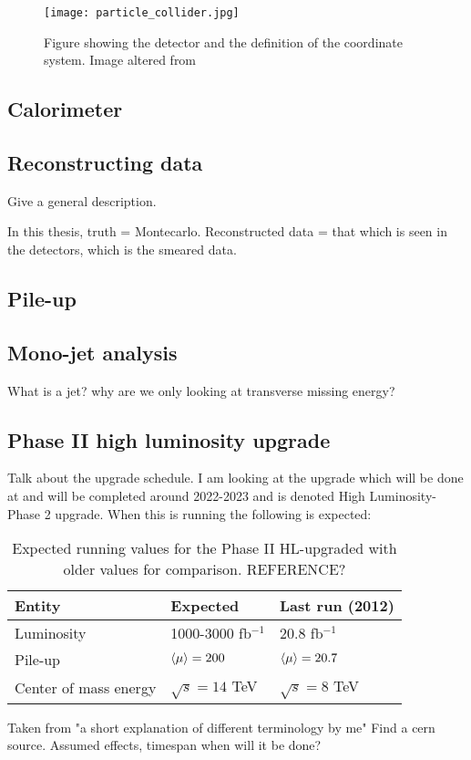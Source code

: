 \begin{figure}[ht]
\begin{center}
\texttt{[image: particle\_collider.jpg]}
\caption{Figure showing the \abbrATLAS detector and the definition of the coordinate system. Image altered from\citep{coordimage}}
\label{fig:coordinatesystem}
\end{center}
\end{figure}

\subsection{Calorimeter}
\subsection{Reconstructing data}
Give a general description.

In this thesis, truth = Montecarlo. 
Reconstructed data = that which is seen in the detectors, which is the smeared data.
\subsection{Pile-up}\label{sec:experiment:subsec:pileup}
\subsection{Mono-jet analysis}\label{sec:experiment:subsec:monojet}
What is a jet? why are we only looking at transverse missing energy? 

\subsection{Phase II high luminosity upgrade}
Talk about the upgrade schedule. \citep{ATLAS:LOI2}
I am looking at the upgrade which will be done at \abbrCERN and will be completed around 2022-2023 and is denoted High Luminosity-\abbrLHC Phase 2 upgrade. When this is running the following is expected:
\renewcommand{\arraystretch}{1.5} %
\begin{table}[H]
\begin{center}
    \begin{tabular}{ | l | l | l |}
    \hline
    Entity & Expected & Last run (2012) \\ \hline
  	Luminosity & 1000-3000 fb$^{-1}$ & 20.8 fb$^{-1}$ \\ \hline
  	Pile-up & $\left<\mu\right>=200$ & $\left<\mu\right>=20.7$ \\ \hline
  	Center of mass energy & $\sqrt{s}=14$ TeV &  $\sqrt{s}=8$ TeV \\ \hline
  	\end{tabular}
  	
  	\caption{Expected running values for the Phase II HL-upgraded \abbrLHC with older values for comparison. REFERENCE?}
  	\label{tab:expectvalues}
  	\end{center}
    \end{table}
    \renewcommand{\arraystretch}{1.0}  %
Taken from "a short explanation of different terminology by me" Find a cern source.
Assumed effects, timespan when will it be done?

